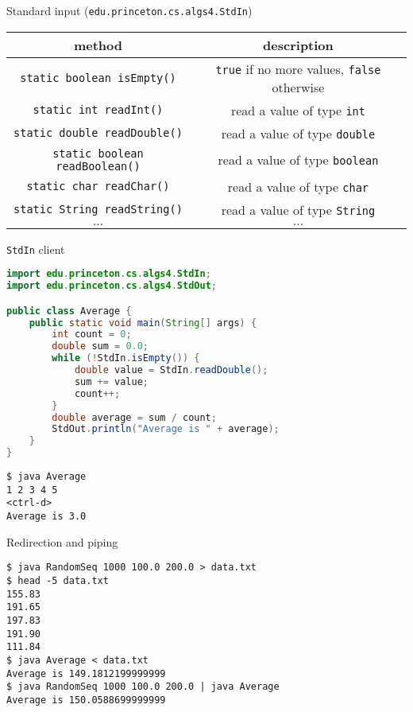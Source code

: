 \documentclass[8pt,a4paper,compress]{beamer}
\begin{document}
\begin{frame}[fragile]
Standard input (\lstinline{edu.princeton.cs.algs4.StdIn})
\begin{center}
\begin{tabular}{cc}
method & description \\ \hline
\lstinline$static boolean isEmpty()$ & \lstinline$true$ if no more values, \lstinline$false$ otherwise \\
\lstinline$static int readInt()$ & read a value of type \lstinline$int$ \\
\lstinline$static double readDouble()$ & read a value of type \lstinline$double$ \\
\lstinline$static boolean readBoolean()$ & read a value of type \lstinline$boolean$ \\
\lstinline$static char readChar()$ & read a value of type \lstinline$char$ \\
\lstinline$static String readString()$ & read a value of type \lstinline$String$ \\
$\dots$ & $\dots$ 
\end{tabular} 
\end{center}

\lstinline{StdIn} client
\begin{lstlisting}[language=Java]
import edu.princeton.cs.algs4.StdIn;
import edu.princeton.cs.algs4.StdOut;

public class Average { 
    public static void main(String[] args) { 
        int count = 0; 
        double sum = 0.0;
        while (!StdIn.isEmpty()) {
            double value = StdIn.readDouble();
            sum += value;
            count++;
        }
        double average = sum / count;
        StdOut.println("Average is " + average);
    }
}
\end{lstlisting}

\begin{lstlisting}[language={}]
$ java Average
1 2 3 4 5
<ctrl-d>
Average is 3.0
\end{lstlisting}
\end{frame}

\begin{frame}[fragile]
Redirection and piping
\begin{lstlisting}[language={}]
$ java RandomSeq 1000 100.0 200.0 > data.txt
$ head -5 data.txt
155.83
191.65
197.83
191.90
111.84
$ java Average < data.txt
Average is 149.1812199999999
$ java RandomSeq 1000 100.0 200.0 | java Average
Average is 150.0588699999999
\end{lstlisting}
\end{frame}
\end{document}
